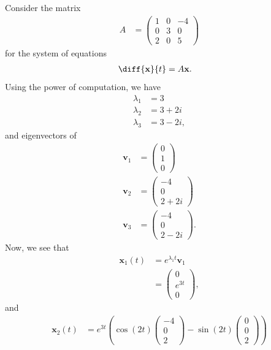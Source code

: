 \documentclass[10pt]{mypackage}
\begin{document}
\begin{example}
  Consider the matrix
  \begin{align*}
    A &= \begin{pmatrix}1 & 0 & -4 \\ 0 & 3 & 0 \\ 2 & 0 & 5\end{pmatrix}
  \end{align*}
  for the system of equations
  \begin{align*}
    \diff{\mathbf{x}}{t} &= A\mathbf{x}.
  \end{align*}
  Using the power of computation, we have
  \begin{align*}
    \lambda_1 &= 3\\
    \lambda_2 &= 3+2i\\
    \lambda_3 &= 3-2i,
  \end{align*}
  and eigenvectors of
  \begin{align*}
    \mathbf{v}_1 &= \begin{pmatrix}0\\1\\0\end{pmatrix}\\
    \mathbf{v}_2 &= \begin{pmatrix}-4\\0\\2+2i\end{pmatrix}\\
    \mathbf{v}_3 &= \begin{pmatrix}-4\\0\\2-2i\end{pmatrix}.
  \end{align*}
  Now, we see that
  \begin{align*}
    \mathbf{x}_1(t) &= e^{\lambda_1 t}\mathbf{v}_1\\
                    &= \begin{pmatrix}0\\e^{3t}\\0\end{pmatrix},
  \end{align*}
  and
  \begin{align*}
    \mathbf{x}_2(t) &= e^{3t}\left( \cos\left( 2t \right) \begin{pmatrix}-4\\0\\2\end{pmatrix} - \sin\left( 2t \right) \begin{pmatrix}0\\0\\2\end{pmatrix} \right)\\

\end{align*}
\end{example}
\end{document}
